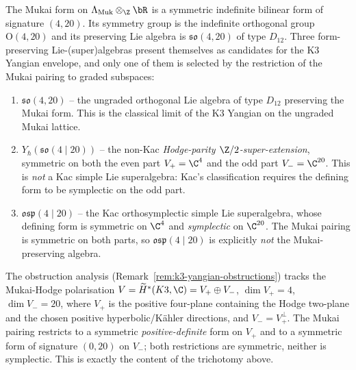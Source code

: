 The Mukai form on $\Lambda_{\mathrm{Muk}} \otimes_\Z \bR$ is a
symmetric indefinite bilinear form of signature $(4, 20)$. Its
symmetry group is the indefinite orthogonal group $\mathrm{O}(4, 20)$
and its preserving Lie algebra is $\mathfrak{so}(4, 20)$ of type
$D_{12}$. Three form-preserving Lie-(super)algebras present themselves
as candidates for the K3 Yangian envelope, and only one of them is
selected by the restriction of the Mukai pairing to graded subspaces:
\begin{enumerate}[label=\textup{(\alph*)}]
\item $\mathfrak{so}(4, 20)$ -- the ungraded orthogonal Lie algebra of
 type $D_{12}$ preserving the Mukai form. This is the classical
 limit of the K$3$ Yangian on the ungraded Mukai lattice.
\item $Y_\hbar(\mathfrak{so}(4 \mid 20))$ -- the non-Kac
 \emph{Hodge-parity $\Z/2$-super-extension}, symmetric on both the
 even part $V_+ = \C^4$ and the odd part $V_- = \C^{20}$. This is
 \emph{not} a Kac simple Lie superalgebra: Kac's classification
 \cite{Kac1977} requires the defining form to be symplectic on the
 odd part.
\item $\mathfrak{osp}(4 \mid 20)$ -- the Kac orthosymplectic simple
 Lie superalgebra, whose defining form is symmetric on $\C^4$ and
 \emph{symplectic} on $\C^{20}$. The Mukai pairing is symmetric on
 both parts, so $\mathfrak{osp}(4 \mid 20)$ is explicitly \emph{not}
 the Mukai-preserving algebra.
\end{enumerate}

The obstruction analysis (Remark~\ref{rem:k3-yangian-obstructions})
tracks the Mukai-Hodge polarisation
$V = \widetilde H^*(K3, \C) = V_+ \oplus V_-$, $\dim V_+ = 4$,
$\dim V_- = 20$, where \(V_+\) is the positive four-plane containing
the Hodge two-plane and the chosen positive hyperbolic/K\"ahler
directions, and \(V_-=V_+^\perp\).
The Mukai pairing restricts to a symmetric \emph{positive-definite} form on
$V_+$ and to a symmetric form of signature $(0, 20)$ on $V_-$; both
restrictions are symmetric, neither is symplectic. This is exactly
the content of the trichotomy above.

